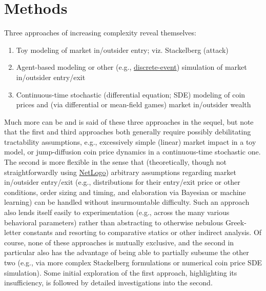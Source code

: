 \documentclass{article}
\begin{document}
\section{Methods}
Three approaches of increasing complexity reveal themselves:
\begin{enumerate}
    \item Toy modeling of market in/outsider entry; viz. Stackelberg (attack)
    \item Agent-based modeling or other (e.g., \href{https://en.wikipedia.org/wiki/Discrete-event_simulation}{discrete-event}) simulation of market in/outsider entry/exit
    \item Continuous-time stochastic (differential equation; SDE) modeling of coin prices and (via differential or mean-field games) market in/outsider wealth
\end{enumerate}
Much more can be and is said of these three approaches in the sequel, but note that the first and third approaches both generally require possibly debilitating tractability assumptions, e.g., excessively simple (linear) market impact in a toy model, or jump-diffusion coin price dynamics in a continuous-time stochastic one.  The second is more flexible in the sense that (theoretically, though not straightforwardly using \href{https://ccl.northwestern.edu/netlogo/}{NetLogo}) arbitrary assumptions regarding market in/outsider entry/exit (e.g., distributions for their entry/exit price or other conditions, order sizing and timing, and elaboration via Bayesian or machine learning) can be handled without insurmountable difficulty.  Such an approach also lends itself easily to experimentation (e.g., across the many various behavioral parameters) rather than abstracting to otherwise nebulous Greek-letter constants and resorting to comparative statics or other indirect analysis.  Of course, none of these approaches is mutually exclusive, and the second in particular also has the advantage of being able to partially subsume the other two (e.g., via more complex Stackelberg formulations or numerical coin price SDE simulation).  Some initial exploration of the first approach, highlighting its insufficiency, is followed by detailed investigations into the second.
\end{document}
